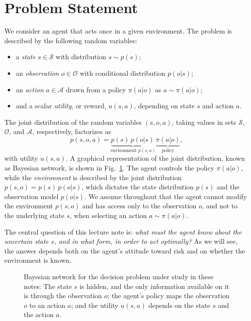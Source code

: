 \documentclass[journal]{IEEEtran}
\theoremstyle{definition}
\theoremstyle{remark}
\newcommand{\Sset}{\mathcal{S}}
\newcommand{\Oset}{\mathcal{O}}
\newcommand{\Aset}{\mathcal{A}}
\begin{document}
\section{Problem Statement}
\label{sec:setting}
We consider an agent that acts once in a given environment. The problem is
described by the following random variables:
\begin{itemize}
\item a \emph{state} $s\in \Sset$ with distribution $s\sim p(s)$;
\item an \emph{observation} $o\in \Oset$ with conditional distribution $p(o| s)$;
\item an \emph{action} $a\in \Aset$ drawn from a policy $\pi(a| o)$ as $a \sim \pi(a| o)$;
\item and a scalar \emph{utility}, or reward, $u(s,a)$, depending on state $s$ and action $a$.
\end{itemize}
The joint distribution of the random variables  $(s,o,a)$, taking values in sets $\mathcal{S}$, $\mathcal{O}$, and $\mathcal{A}$, respectively,  factorizes as
\begin{equation}
\label{eq:joint}
p(s,o,a)=\underbrace{p(s)\,p(o| s)\,}_{\text{environment }p(s,o)}\underbrace{\pi(a| o)}_{\text{policy}},
\end{equation}
with utility $u(s,a)$. A graphical representation of the joint distribution, known as  Bayesian network,   is shown in
Fig.~\ref{fig:bn}. The agent controls the policy $\pi(a| o)$, while the
\emph{environment} is described by the joint distribution
$p(s,o)=p(s)\,p(o| s)$, which dictates the state distribution $p(s)$ and the
observation model $p(o|s)$. We assume throughout that the agent cannot modify the
environment $p(s,o)$ and has access only to the observation $o$, and not to
the underlying state $s$, when selecting an action $a\sim \pi(a|o)$.

The central question of this lecture note is: \emph{what must the agent know
about the uncertain state $s$, and in what form, in order to act optimally?} As
we will see, the answer depends both on the agent's attitude toward risk and
on whether the environment is known.

\begin{figure}[t]
\centering
{}
\caption{Bayesian network for the decision problem under study in these notes: The state $s$ is hidden, and the only information available on it is through the observation $o$; the agent's policy maps the observation $o$ to an action
$a$; and the utility $u(s,a)$ 
depends on the state $s$ and the action $a$.}
\label{fig:bn}
\end{figure}
\end{document}
